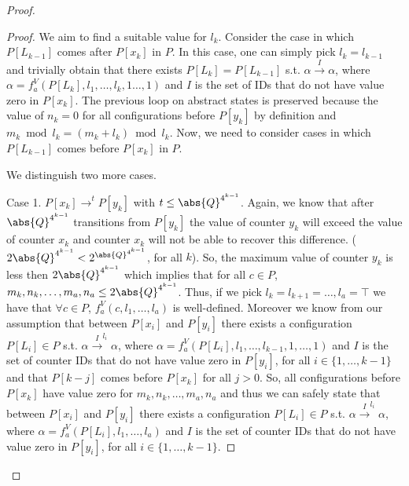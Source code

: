 \begin{proof}
\begin{proof}
We aim to find a suitable value for $l_k$. Consider the case in which $P[L_{k-1}]$ comes after $P[x_k]$ in $P$. In this case, one can simply pick $l_k=l_{k-1}$ and trivially obtain that there exists $P[L_k]=P[L_{k-1}]$ s.t. $\alpha\xrightarrow{I}\alpha$, where $\alpha = f_a^V(P[L_k],l_1,\dots,l_k,1\dots,1)$ and $I$ is the set of IDs that do not have value zero in $P[x_k]$. The previous loop on abstract states is preserved because the value of $n_k=0$ for all configurations before $P[y_k]$ by definition and $m_k\bmod l_k = (m_k+l_k)\bmod l_k$. Now, we need to consider cases in which $P[L_{k-1}]$ comes before $P[x_k]$ in $P$.

We distinguish two more cases.

Case 1. $P[x_k]\xrightarrow[]{}^t P[y_k]$ with $t\leq\abs{Q}^{4^{k-1}}$. Again, we know that after $\abs{Q}^{4^{k-1}}$ transitions from $P[y_k]$ the value of counter $y_k$ will exceed the value of counter $x_k$ and counter $x_k$ will not be able to recover this difference. ($2\abs{Q}^{4^{k-1}}<2^{\abs{Q}^{4^{k-1}}}$, for all $k$). So, the maximum value of counter $y_k$ is less then $2\abs{Q}^{4^{k-1}}$ which implies that for all $c\in P$, $m_k,n_k,\dots,m_a,n_a\leq 2\abs{Q}^{4^{k-1}}$. Thus, if we pick $l_k=l_{k+1}=\dots,l_a=\top$ we have that $\forall c\in P$, $f_a^V(c,l_1,\dots,l_a)$ is well-defined. Moreover we know from our assumption that between $P[x_i]$ and $P[y_i]$ there exists a configuration $P[L_i]\in P$ s.t. $\alpha\xrightarrow{I}^{l_i}\alpha$, where $\alpha=f_a^V(P[L_i],l_1,\dots,l_{k-1},1,\dots,1)$ and $I$ is the set of counter IDs that do not have value zero in $P[y_i]$, for all $i\in\{1,\dots,k-1\}$ and that $P[k-j]$ comes before $P[x_k]$ for all $j>0$. So, all configurations before $P[x_k]$ have value zero for $m_k,n_k,\dots,m_a,n_a$ and thus we can safely state that between $P[x_i]$ and $P[y_i]$ there exists a configuration $P[L_i]\in P$ s.t. $\alpha\xrightarrow{I}^{l_i}\alpha$, where $\alpha=f_a^V(P[L_i],l_1,\dots,l_{a})$ and $I$ is the set of counter IDs that do not have value zero in $P[y_i]$, for all $i\in\{1,\dots,k-1\}$.


\end{proof}
\end{proof}
